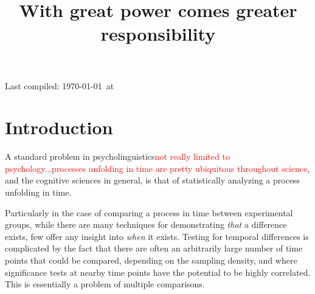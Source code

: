\documentclass{article}
\title{With great power comes greater responsibility}
\date{}
\newcommand{\xt}{\texttt}
\providecommand{\pb}[1]{\textcolor{red}{#1}}
\begin{document}

\maketitle

Last compiled: \today \  at \currenttime


%


\section{Introduction}

A standard problem in psycholinguistics\pb{not really limited to psychology...processes unfolding in time are pretty ubiquitous throughout science}, and the cognitive sciences in general, is that of statistically analyzing a process unfolding in time. 

Particularly in the case of comparing a process in time between experimental groups, while there are many techniques for demonstrating \textit{that} a difference exists, few offer any insight into \textit{when} it exists. Testing for temporal differences is complicated by the fact that there are often an arbitrarily large number of time points that could be compared, depending on the sampling density, and where significance tests at nearby time points have the potential to be highly correlated. This is essentially a problem of multiple comparisons.
\end{document}
